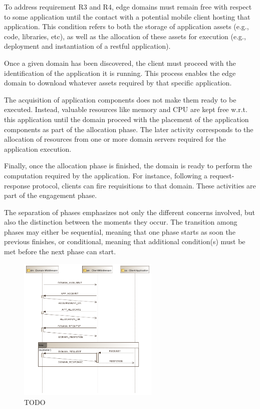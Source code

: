 To address requirement R3 and R4, edge domains must remain free with respect to some application until the contact with a potential mobile client hosting that application. This condition refers to both the storage of application assets (e.g., code, libraries, etc), as well as the allocation of these assets for execution (e.g., deployment and instantiation of a restful application). 

Once a given domain has been discovered, the client must proceed with the identification of the application it is running. This process enables the edge domain to download whatever assets required by that specific application.  

The acquisition of application components does not make them ready to be executed. Instead, valuable resources like memory and CPU are kept free w.r.t. this application until the domain proceed with the placement of the application components as part of the allocation phase. The later activity corresponds to the allocation of resources from one or more domain servers required for the application execution. 	

Finally, once the allocation phase is finished, the domain is ready to perform the computation required by the application. For instance, following a request-response protocol, clients can fire requisitions to that domain. These activities are part of the engagement phase.

The separation of phases emphasizes not only the different concerns involved, but also the distinction between the moments they occur. The transition among phases may either be sequential, meaning that one phase starts as soon the previous finishes, or conditional, meaning that additional condition(s) must be met before the next phase can start. 	



\begin{figure}
  \includegraphics[width=0.6\textwidth]{figs/protocols.png}
  \caption{TODO}
  \label{fig:protocols}
\end{figure}

